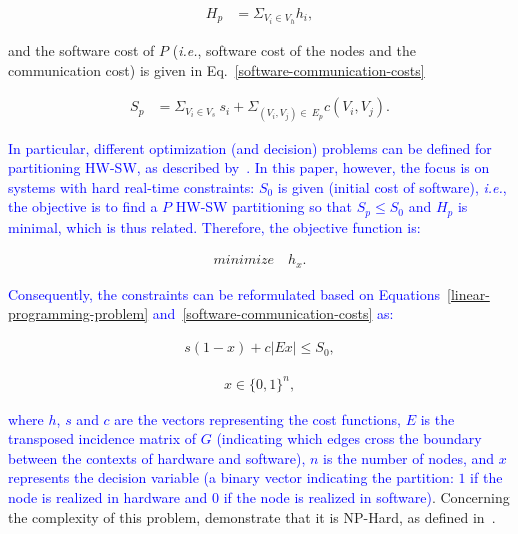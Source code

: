 \documentclass{doublecol-new}
\theoremstyle{TH}{
\newtheorem{lemma}{Lemma}
\newtheorem{theorem}[lemma]{Theorem}
\newtheorem{corrolary}[lemma]{Corrolary}
\newtheorem{conjecture}[lemma]{Conjecture}
\newtheorem{proposition}[lemma]{Proposition}
\newtheorem{claim}[lemma]{Claim}
\newtheorem{stheorem}[lemma]{Wrong Theorem}
\newtheorem{algorithm}{Algorithm}
}
\theoremstyle{THrm}{
\newtheorem{definition}{Definition}[section]
\newtheorem{question}{Question}[section]
\newtheorem{remark}{Remark}
\newtheorem{scheme}{Scheme}
}
\theoremstyle{THhit}{
\newtheorem{case}{Case}[section]
}
\begin{document}
\vspace{-5 mm}
\begin{align}
\label{hardware-costs}
H_p  &= \Sigma_{V_i \in V_h} h_i,
\end{align}

\vspace{2 mm}
\noindent
and the software cost of $P$ ({\it i.e.}, software cost of the nodes and the communication cost) is given in Eq.~\eqref{software-communication-costs}

\vspace{-3 mm}
\begin{align}
\label{software-communication-costs}
  S_p &= \Sigma_{V_i \in V_s}\:s_i + \Sigma_{(V_i,V_j)\in\:E_p} c(V_i,V_j).
\end{align}

\vspace{2 mm}
\textcolor{blue}{In particular, different optimization (and decision) problems can be defined for partitioning HW-SW, as described by~\cite{Arato2003}. In this paper, however, the focus is on systems with hard real-time constraints: $ S_0 $ is given (initial cost of software), {\it i.e.}, the objective is to find a $P$ HW-SW partitioning so that $ S_p \leq S_0 $ and $ H_p $ is minimal, which is thus related. Therefore, the objective function is:} 

\vspace{-2 mm}
\begin{align}
\label{objective-function}
minimize\quad h_x.
\end{align}

\textcolor{blue}{Consequently, the constraints can be reformulated based on Equations~\eqref{linear-programming-problem} and~\eqref{software-communication-costs} as:}

\vspace{-2 mm}
\begin{align}
\label{hw-sw-partitioning}
s\left(1-x\right) + c|Ex| \leq S_0,
\end{align}

\vspace{-2 mm}
\begin{align}
\label{hw-sw-partitioning2}
x \in \{0,1\}^n, 
\end{align}

\vspace{2 mm}
\noindent \textcolor{blue}{where $h$, $s$ and $c$ are the vectors representing the cost functions, $E$ is the transposed incidence matrix of $G$ (indicating which edges cross the boundary between the contexts of hardware and software), $n$ is the number of nodes, and $x$ represents the decision variable (a binary vector indicating the partition: $1$ if the node is realized in hardware and $0$ if the node is realized in software)}. Concerning the complexity of this problem, \cite{Arato2003} demonstrate that it is NP-Hard, as defined in~\cite{Cormem}.
\end{document}
